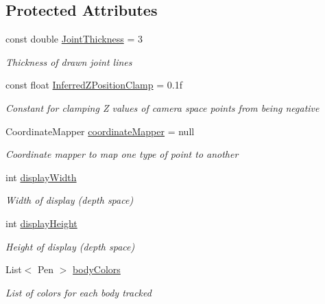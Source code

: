 \subsection*{Protected Attributes}
\begin{DoxyCompactItemize}
\item 
const double \hyperlink{class_rowing_monitor_1_1_model_1_1_frontal_view_af0d4024f6496a4408e27f1d7bb4327b8}{Joint\+Thickness} = 3
\begin{DoxyCompactList}\small\item\em Thickness of drawn joint lines \end{DoxyCompactList}\item 
const float \hyperlink{class_rowing_monitor_1_1_model_1_1_frontal_view_a5f663eb0eda7d5561022fa1b048ff28c}{Inferred\+Z\+Position\+Clamp} = 0.\+1f
\begin{DoxyCompactList}\small\item\em Constant for clamping Z values of camera space points from being negative \end{DoxyCompactList}\item 
Coordinate\+Mapper \hyperlink{class_rowing_monitor_1_1_model_1_1_frontal_view_ad84cc9acd2d1b4115e6e629e846a3af5}{coordinate\+Mapper} = null
\begin{DoxyCompactList}\small\item\em Coordinate mapper to map one type of point to another \end{DoxyCompactList}\item 
int \hyperlink{class_rowing_monitor_1_1_model_1_1_frontal_view_afc81707e7875ed8b92615ab2dc15fc09}{display\+Width}
\begin{DoxyCompactList}\small\item\em Width of display (depth space) \end{DoxyCompactList}\item 
int \hyperlink{class_rowing_monitor_1_1_model_1_1_frontal_view_a92e19bf18d30a31c1c44d7072a5079aa}{display\+Height}
\begin{DoxyCompactList}\small\item\em Height of display (depth space) \end{DoxyCompactList}\item 
List$<$ Pen $>$ \hyperlink{class_rowing_monitor_1_1_model_1_1_frontal_view_a75389fa61ab8d54d93aadc11d5d5360e}{body\+Colors}
\begin{DoxyCompactList}\small\item\em List of colors for each body tracked \end{DoxyCompactList}\end{DoxyCompactItemize}
